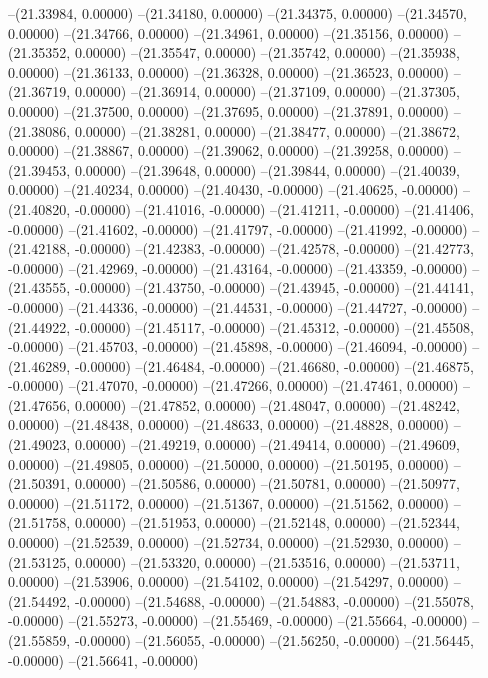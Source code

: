 --(21.33984, 0.00000)
--(21.34180, 0.00000)
--(21.34375, 0.00000)
--(21.34570, 0.00000)
--(21.34766, 0.00000)
--(21.34961, 0.00000)
--(21.35156, 0.00000)
--(21.35352, 0.00000)
--(21.35547, 0.00000)
--(21.35742, 0.00000)
--(21.35938, 0.00000)
--(21.36133, 0.00000)
--(21.36328, 0.00000)
--(21.36523, 0.00000)
--(21.36719, 0.00000)
--(21.36914, 0.00000)
--(21.37109, 0.00000)
--(21.37305, 0.00000)
--(21.37500, 0.00000)
--(21.37695, 0.00000)
--(21.37891, 0.00000)
--(21.38086, 0.00000)
--(21.38281, 0.00000)
--(21.38477, 0.00000)
--(21.38672, 0.00000)
--(21.38867, 0.00000)
--(21.39062, 0.00000)
--(21.39258, 0.00000)
--(21.39453, 0.00000)
--(21.39648, 0.00000)
--(21.39844, 0.00000)
--(21.40039, 0.00000)
--(21.40234, 0.00000)
--(21.40430, -0.00000)
--(21.40625, -0.00000)
--(21.40820, -0.00000)
--(21.41016, -0.00000)
--(21.41211, -0.00000)
--(21.41406, -0.00000)
--(21.41602, -0.00000)
--(21.41797, -0.00000)
--(21.41992, -0.00000)
--(21.42188, -0.00000)
--(21.42383, -0.00000)
--(21.42578, -0.00000)
--(21.42773, -0.00000)
--(21.42969, -0.00000)
--(21.43164, -0.00000)
--(21.43359, -0.00000)
--(21.43555, -0.00000)
--(21.43750, -0.00000)
--(21.43945, -0.00000)
--(21.44141, -0.00000)
--(21.44336, -0.00000)
--(21.44531, -0.00000)
--(21.44727, -0.00000)
--(21.44922, -0.00000)
--(21.45117, -0.00000)
--(21.45312, -0.00000)
--(21.45508, -0.00000)
--(21.45703, -0.00000)
--(21.45898, -0.00000)
--(21.46094, -0.00000)
--(21.46289, -0.00000)
--(21.46484, -0.00000)
--(21.46680, -0.00000)
--(21.46875, -0.00000)
--(21.47070, -0.00000)
--(21.47266, 0.00000)
--(21.47461, 0.00000)
--(21.47656, 0.00000)
--(21.47852, 0.00000)
--(21.48047, 0.00000)
--(21.48242, 0.00000)
--(21.48438, 0.00000)
--(21.48633, 0.00000)
--(21.48828, 0.00000)
--(21.49023, 0.00000)
--(21.49219, 0.00000)
--(21.49414, 0.00000)
--(21.49609, 0.00000)
--(21.49805, 0.00000)
--(21.50000, 0.00000)
--(21.50195, 0.00000)
--(21.50391, 0.00000)
--(21.50586, 0.00000)
--(21.50781, 0.00000)
--(21.50977, 0.00000)
--(21.51172, 0.00000)
--(21.51367, 0.00000)
--(21.51562, 0.00000)
--(21.51758, 0.00000)
--(21.51953, 0.00000)
--(21.52148, 0.00000)
--(21.52344, 0.00000)
--(21.52539, 0.00000)
--(21.52734, 0.00000)
--(21.52930, 0.00000)
--(21.53125, 0.00000)
--(21.53320, 0.00000)
--(21.53516, 0.00000)
--(21.53711, 0.00000)
--(21.53906, 0.00000)
--(21.54102, 0.00000)
--(21.54297, 0.00000)
--(21.54492, -0.00000)
--(21.54688, -0.00000)
--(21.54883, -0.00000)
--(21.55078, -0.00000)
--(21.55273, -0.00000)
--(21.55469, -0.00000)
--(21.55664, -0.00000)
--(21.55859, -0.00000)
--(21.56055, -0.00000)
--(21.56250, -0.00000)
--(21.56445, -0.00000)
--(21.56641, -0.00000)
